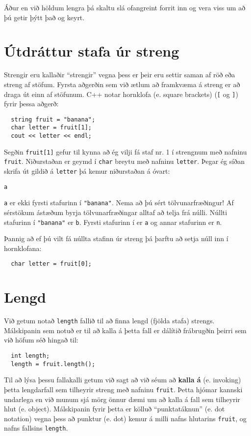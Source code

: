 Áður en við höldum lengra þá skaltu slá ofangreint forrit inn og vera viss um að þú getir þýtt það og keyrt.

\section{Útdráttur stafa úr streng}

Strengir eru kallaðir ``strengir'' vegna þess er þeir eru settir saman af röð eða streng af stöfum.
Fyrsta aðgerðin sem við ætlum að framkvæma á streng er að draga út einn af stöfunum.
C++ notar hornklofa (e. square brackets) ({\tt [} og {\tt ]}) fyrir þessa aðgerð:

\begin{verbatim}
  string fruit = "banana";
  char letter = fruit[1];
  cout << letter << endl;
\end{verbatim}
%
Segðin {\tt fruit[1]} gefur til kynna að ég vilji fá staf nr. 1 í strengnum með nafninu {\tt fruit}.
Niðurstaðan er geymd í {\tt char} breytu með nafninu {\tt letter}.
Þegar ég síðan skrifa út gildið á {\tt letter} þá kemur niðurstaðan á óvart:

\begin{verbatim}
a
\end{verbatim}
%
{\tt a} er ekki fyrsti stafurinn í \verb+"banana"+.
Nema að þú sért tölvunarfræðingur!
Af sérstökum ástæðum byrja tölvunarfræðingar alltaf að telja frá núlli.
Núllti stafurinn í \verb+"banana"+ er {\tt b}.
Fyrsti stafurinn í er {\tt a} og annar stafurinn er {\tt n}.

Þannig að ef þú vilt fá núllta stafinn úr streng þá þarftu að setja núll inn í hornklofana: 

\begin{verbatim}
  char letter = fruit[0];
\end{verbatim}

\section{Lengd}

Við getum notað {\tt length} fallið til að finna lengd (fjölda stafa) strengs.
Málskipanin sem notuð er til að kalla á þetta fall er dálítið frábrugðin þeirri sem við höfum séð hingað til:

\begin{verbatim}
  int length;
  length = fruit.length();
\end{verbatim}
%
Til að lýsa þessu fallakalli getum við sagt að við séum að {\bf kalla á} (e. invoking) þetta lengdarfall sem tilheyrir streng með nafninu {\tt fruit}.
Þetta hjómar kannski undarlega en við munum sjá mörg önnur dæmi um að kalla á fall sem tilheyrir hlut (e. object).
Málskipanin fyrir þetta er kölluð ``punktatáknun'' (e. dot notation) vegna þess að punktur (e. dot) kemur á milli nafns hlutarins
{\tt fruit}, og nafns fallsins {\tt length}.

